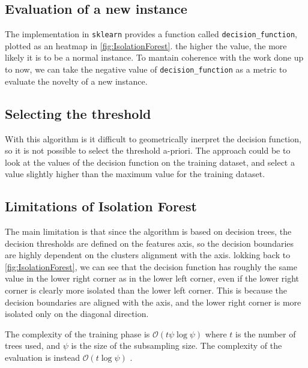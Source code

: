 \subsection{Evaluation of a new instance}
The implementation in \texttt{sklearn} provides a function called \texttt{decision\_function}, plotted as an heatmap in \autoref{fig:IsolationForest}. the higher the value, the more likely it is to be a normal instance.
To mantain coherence with the work done up to now, we can take the negative value of \texttt{decision\_function} as a metric to evaluate the novelty of a new instance.

\subsection{Selecting the threshold}
\label{sec:iforest_threshold}
With this algorithm is it difficult to geometrically inerpret the decision function, so it is not possible to select the threshold a-priori. The approach could be to look at the values of the decision function on the training dataset, and select a value slightly higher than the maximum value for the training dataset.

\subsection{Limitations of Isolation Forest}
The main limitation is that since the algorithm is based on decision trees, the decision thresholds are defined on the features axis, so the decision boundaries are highly dependent on the clusters alignment with the axis. lokking back to \autoref{fig:IsolationForest}, we can see that the decision function has roughly the same value in the lower right corner as in the lower left corner, even if the lower right corner is clearly more isolated than the lower left corner. This is because the decision boundaries are aligned with the axis, and the lower right corner is more isolated only on the diagonal direction.

The complexity of the training phase is $\mathcal{O}(t\psi\log\psi)$ where $t$ is the number of trees used, and $\psi$ is the size of the subsampling size. The complexity of the evaluation is instead $\mathcal{O}(t\log\psi)$ \cite{iforest}.